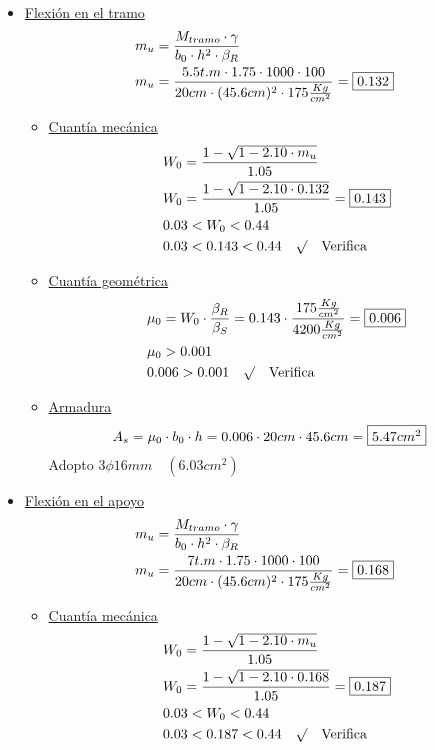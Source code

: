 \begin{enumerate}
\begin{itemize}
\item \underline{Flexión en el tramo}
\begin{align*}
& m_u = \frac{M_{tramo} \cdot \gamma}{b_0 \cdot h^2 \cdot \beta_R} \\
& m_u= \frac{5.5 t.m \cdot 1.75 \cdot 1000 \cdot 100}{20cm \cdot (45.6cm)^2 \cdot 175 \frac{Kg}{cm^2}} = \framebox{$0.132$}\\
\end{align*}

\begin{itemize}
\item \underline{Cuantía mecánica}
\begin{align*}
& W_0 = \frac{1- \sqrt{1-2.10 \cdot m_u}}{1.05} \\
& W_0 = \frac{1- \sqrt{1-2.10 \cdot 0.132}}{1.05} = \framebox{$0.143$}\\
& 0.03 < W_0 < 0.44\\
& 0.03 < 0.143 < 0.44 \quad \surd \quad \text{Verifica}
\end{align*}

\item \underline{Cuantía geométrica}
\begin{align*}
&\mu_0 = W_0 \cdot \frac{\beta_R}{\beta_S} = 0.143 \cdot \frac{175 \frac{Kg}{cm^2}}{4200 \frac{Kg}{cm^2}} = \framebox{$0.006$}\\
&\mu_0 > 0.001\\
& 0.006 > 0.001 \quad \surd \quad \text{Verifica}
\end{align*}

\item \underline{Armadura}
\begin{align*}
& A_s = \mu_0 \cdot b_0 \cdot h = 0.006 \cdot 20cm \cdot 45.6cm = \framebox{$5.47cm^2$}
\end{align*}
Adopto $3 \phi 16mm \quad (6.03cm^2)$
\end{itemize}

\item \underline{Flexión en el apoyo}
\begin{align*}
& m_u = \frac{M_{tramo} \cdot \gamma}{b_0 \cdot h^2 \cdot \beta_R} \\
& m_u= \frac{7 t.m \cdot 1.75 \cdot 1000 \cdot 100}{20cm \cdot (45.6cm)^2 \cdot 175 \frac{Kg}{cm^2}} = \framebox{$0.168$}\\
\end{align*}

\begin{itemize}
\item \underline{Cuantía mecánica}
\begin{align*}
& W_0 = \frac{1- \sqrt{1-2.10 \cdot m_u}}{1.05} \\
& W_0 = \frac{1- \sqrt{1-2.10 \cdot 0.168}}{1.05} = \framebox{$0.187$}\\
& 0.03 < W_0 < 0.44\\
& 0.03 < 0.187 < 0.44 \quad \surd \quad \text{Verifica}
\end{align*}


\end{itemize}
\end{itemize}
\end{enumerate}
